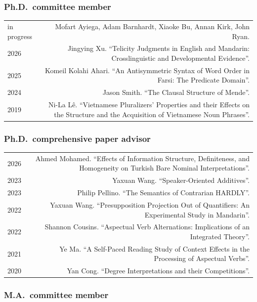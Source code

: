 \documentclass[12pt,letterpaper,twoside]{article}
\makeatletter
\newenvironment{cvsection}{%
  \begin{longtable}[l]{@{}L@{} @{}R@{}}
}{%
  \end{longtable}
}
\makeatother
\begin{document}
\subsubsection*{Ph.D.~committee member}

\begin{cvsection}
  in progress & Mofart Ayiega, Adam Barnhardt, Xiaoke Bu, Annan Kirk, John Ryan.\\
  2026 & Jingying Xu. ``Telicity Judgments in English and Mandarin: Crosslinguistic and Developmental Evidence''.\\
  2025 & Komeil Kolahi Ahari. ``An Antisymmetric Syntax of Word Order in Farsi: The Predicate Domain''.\\
  2024 & Jason Smith. ``The Clausal Structure of Mende''.\\
  2019 & Ni-La Lê. ``Vietnamese Pluralizers' Properties and their Effects on the Structure and the Acquisition of Vietnamese Noun Phrases''.\\
\end{cvsection}

\subsubsection*{Ph.D.~comprehensive paper advisor}

\begin{cvsection}
  2026 & Ahmed Mohamed. ``Effects of Information Structure, Definiteness, and Homogeneity on Turkish Bare Nominal Interpretations''.\\
  2023 & Yaxuan Wang. ``Speaker-Oriented Additives''.\\
  2023 & Philip Pellino. ``The Semantics of Contrarian HARDLY''.\\
  2022 & Yaxuan Wang. ``Presupposition Projection Out of Quantifiers: An Experimental Study in Mandarin''.\\
  2022 & Shannon Cousins. ``Aspectual Verb Alternations: Implications of an Integrated Theory''.\\
  2021 & Ye Ma. ``A Self-Paced Reading Study of Context Effects in the Processing of Aspectual Verbs''.\\
  2020 & Yan Cong. ``Degree Interpretations and their Competitions''.\\
\end{cvsection}

\subsubsection*{M.A.~committee member}
\end{document}
